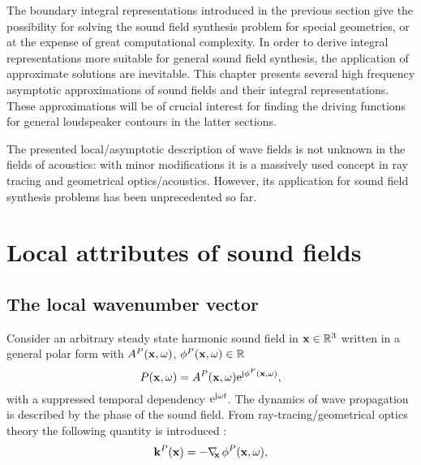 The boundary integral representations introduced in the previous section give the possibility for solving the sound field synthesis problem for special geometries, or at the expense of great computational complexity.
In order to derive integral representations more suitable for general sound field synthesis, the application of approximate solutions are inevitable.
This chapter presents several high frequency asymptotic approximations of sound fields and their integral representations.
These approximations will be of crucial interest for finding the driving functions for general loudspeaker contours in the latter sections.


The presented local/asymptotic description of wave fields is not unknown in the fields of acoustics: with minor modifications it is a massively used concept in ray tracing and geometrical optics/acoustics.
However, its application for sound field synthesis problems has been unprecedented so far.

\section{Local attributes of sound fields}
\subsection{The local wavenumber vector}

Consider an arbitrary steady state harmonic sound field in $\mathbf{x} \in \mathbb{R}^3$ written in a general polar form with $A^P(\mathbf{x},\omega)$, $\phi^P(\mathbf{x},\omega) \in \mathbb{R}$
\begin{equation}
P(\mathbf{x},\omega) = A^P(\mathbf{x},\omega)\mathrm{e}^{\mathrm{j} \phi^P(\mathbf{x},\omega)},
\label{eq:HF_appr:general_sf}
\end{equation}
%
with a suppressed temporal dependency $\mathrm{e}^{\mathrm{j} \omega t}$.
The dynamics of wave propagation is described by the phase of the sound field.
From ray-tracing/geometrical optics theory the following quantity is introduced \cite{Carozzi2004, Romer2005}:
%
\begin{equation}
\label{eq:local_wn_vec_def}
\mathbf{k}^P(\mathbf{x}) = -\nabla_{\!\!\mathbf{x}}\, \phi^P(\mathbf{x},\omega),
\end{equation}
%

